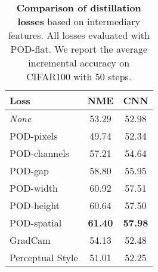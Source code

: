 \begin{table*}
    \centering
    \begin{tabular}{@{}lcc@{}}
        \toprule
        Loss                                                                     & NME            & CNN            \\
        \midrule
        \textit{None}                                                            & 53.29          & 52.98          \\
        POD-pixels                                                               & 49.74          & 52.34          \\
        POD-channels                                                             & 57.21          & 54.64          \\
        POD-gap                                                                  & 58.80          & 55.95          \\
        POD-width                                                                & 60.92          & 57.51          \\
        POD-height                                                               & 60.64          & 57.50          \\
        POD-spatial                                                              & \textbf{61.40} & \textbf{57.98} \\
        \cmidrule{1-3}
        GradCam \scriptsize{\citep{dhar2019learning_without_memorizing_gradcam}} & 54.13          & 52.48          \\
        Perceptual Style \scriptsize{\citep{johnson2016perceptual_losses}}       & 51.01          & 52.25          \\
        \bottomrule
    \end{tabular}
    \caption{\textbf{Comparison of distillation losses} based on intermediary features. All losses evaluated
        with POD-flat. We report the average incremental accuracy on CIFAR100 with 50 steps.}
    \label{tab:podnet_ablation_perceptual}
\end{table*}
